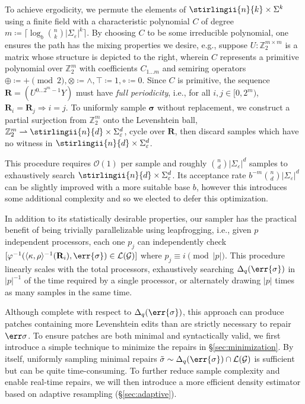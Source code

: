 \documentclass[runningheads]{llncs}
\begin{document}
To achieve ergodicity, we permute the elements of $\stirlingii{n}{k}\times\Sigma^k$ using a finite field with a characteristic polynomial $C$ of degree $m\coloneqq\lceil \log_b {n \choose k}|\Sigma_\varepsilon|^k \rceil$. By choosing $C$ to be some irreducible polynomial, one ensures the path has the mixing properties we desire, e.g., suppose $U: \mathbb{Z}_2^{m\times m}$ is a matrix whose structure is depicted to the right, wherein $C$ represents a primitive polynomial over $\mathbb{Z}_2^m$ with coefficients $C_{1\ldots m}$ and semiring operators $\oplus \coloneqq + \pmod 2, \otimes \coloneqq \land, \top \coloneqq 1, \circ\coloneqq0$. Since $C$ is primitive, the sequence $\mathbf{R} = (U^{0 \ldots 2^m-1}Y)$ must have \textit{full periodicity}, i.e., for all $i, j \in[0, 2^m)$, ${\mathbf{R}_i = \mathbf{R}_j \Rightarrow i = j}$. To uniformly sample $\bm\sigma$ without replacement, we construct a partial surjection from $\mathbb{Z}_2^m$ onto the Levenshtein ball, $\mathbb{Z}_2^m\rightharpoonup\stirlingii{n}{d}\times\Sigma_\varepsilon^{d}$, cycle over $\mathbf{R}$, then discard samples which have no witness in $\stirlingii{n}{d}\times\Sigma_\varepsilon^{d}$.

This procedure requires $\mathcal{O}(1)$ per sample and roughly ${n \choose d}|\Sigma_\varepsilon|^{d}$ samples to exhaustively search $\stirlingii{n}{d}\times\Sigma_\varepsilon^{d}$. Its acceptance rate $b^{-m}{n \choose d}|\Sigma_\varepsilon|^{d}$ can be slightly improved with a more suitable base $b$, however this introduces some additional complexity and so we elected to defer this optimization.

In addition to its statistically desirable properties, our sampler has the practical benefit of being trivially parallelizable using leapfrogging, i.e., given $p$ independent processors, each one $p_j$ can independently check $[\varphi^{-1}(\langle\kappa, \rho\rangle^{-1}(\mathbf{R}_{i}), \err{\sigma}) \in \mathcal{L}(\mathcal{G})]$ where $p_j \equiv i \pmod{|p|}$. This procedure linearly scales with the total processors, exhaustively searching $\Delta_{q}(\err{\sigma})$ in $|p|^{-1}$ of the time required by a single processor, or alternately drawing $|p|$ times as many samples in the same time.

\noindent Although complete with respect to $\Delta_{q}(\err{\sigma})$, this approach can produce patches containing more Levenshtein edits than are strictly necessary to repair $\err\sigma$. To ensure patches are both minimal and syntactically valid, we first introduce a simple technique to minimize the repairs in \S\ref{sec:minimization}. By itself, uniformly sampling minimal repairs $\tilde\sigma\sim\Delta_{q}(\err{\sigma})\cap\mathcal{L}(\mathcal{G})$ is sufficient but can be quite time-consuming. To further reduce sample complexity and enable real-time repairs, we will then introduce a more efficient density estimator based on adaptive resampling (\S\ref{sec:adaptive}).
\end{document}
